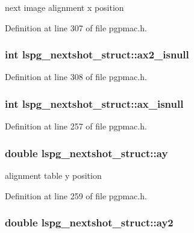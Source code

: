 next image alignment x position 



Definition at line 307 of file pgpmac.\-h.

\hypertarget{structlspg__nextshot__struct_a846845b0b9ecf6517ef85554771ec71d}{
\subsubsection[{ax2\-\_\-isnull}]{\setlength{\rightskip}{0pt plus 5cm}int lspg\-\_\-nextshot\-\_\-struct\-::ax2\-\_\-isnull}}\label{structlspg__nextshot__struct_a846845b0b9ecf6517ef85554771ec71d}


Definition at line 308 of file pgpmac.\-h.

\hypertarget{structlspg__nextshot__struct_aae46c7911b2b218497ad4a68f3dbb7d9}{
\subsubsection[{ax\-\_\-isnull}]{\setlength{\rightskip}{0pt plus 5cm}int lspg\-\_\-nextshot\-\_\-struct\-::ax\-\_\-isnull}}\label{structlspg__nextshot__struct_aae46c7911b2b218497ad4a68f3dbb7d9}


Definition at line 257 of file pgpmac.\-h.

\hypertarget{structlspg__nextshot__struct_a9e20b9a0aeb41f7f7d653a1c60335bf1}{
\subsubsection[{ay}]{\setlength{\rightskip}{0pt plus 5cm}double lspg\-\_\-nextshot\-\_\-struct\-::ay}}\label{structlspg__nextshot__struct_a9e20b9a0aeb41f7f7d653a1c60335bf1}


alignment table y position 



Definition at line 259 of file pgpmac.\-h.

\hypertarget{structlspg__nextshot__struct_ad13759740204b42e379161f98815f3d0}{
\subsubsection[{ay2}]{\setlength{\rightskip}{0pt plus 5cm}double lspg\-\_\-nextshot\-\_\-struct\-::ay2}}\label{structlspg__nextshot__struct_ad13759740204b42e379161f98815f3d0}


